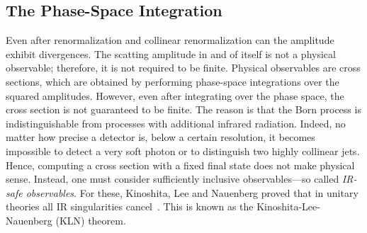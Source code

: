 \subsection{The Phase-Space Integration}\label{subsec:2:phase_space_integration}
Even after renormalization and collinear renormalization can the amplitude exhibit divergences. The scatting amplitude in and of itself is not a physical observable; therefore, it is not required to be finite. Physical observables are cross sections, which are obtained by performing phase-space integrations over the squared amplitudes. However, even after integrating over the phase space, the cross section is not guaranteed to be finite. The reason is that the Born process is indistinguishable from processes with additional infrared radiation. Indeed, no matter how precise a detector is, below a certain resolution, it becomes impossible to detect a very soft photon or to distinguish two highly collinear jets. Hence, computing a cross section with a fixed final state does not make physical sense. Instead, one must consider sufficiently inclusive observables---so called \textit{IR-safe observables}. For these, Kinoshita, Lee and Nauenberg proved that in unitary theories all IR singularities cancel~\cite{Kinoshita:1975bt, Lee:1964is}. This is known as the Kinoshita-Lee-Nauenberg (KLN) theorem.

